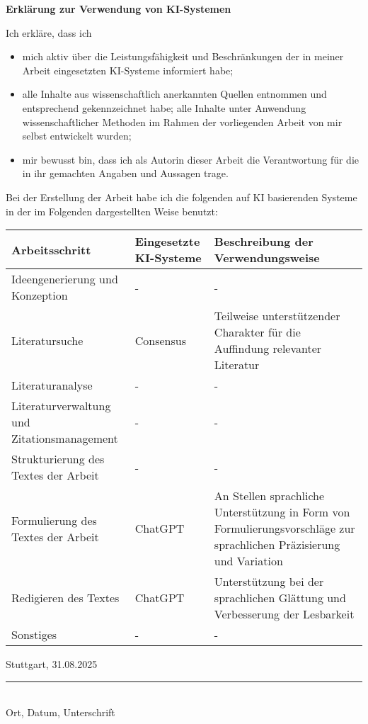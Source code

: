 \clearpage
\thispagestyle{plain} %

{\large\textbf{Erklärung zur Verwendung von \acs{KI}-Systemen}}\par\vspace{0.8\baselineskip}

Ich erkläre, dass ich
\begin{itemize}[leftmargin=2.2em,label=\checkedbox,itemsep=0.45\baselineskip]
  \item mich aktiv über die Leistungsfähigkeit und Beschränkungen der in meiner Arbeit eingesetzten \ac{KI}-Systeme informiert habe;
  \item alle Inhalte aus wissenschaftlich anerkannten Quellen entnommen und entsprechend gekennzeichnet habe; alle Inhalte unter Anwendung wissenschaftlicher Methoden im Rahmen der vorliegenden Arbeit von mir selbst entwickelt wurden;
  \item mir bewusst bin, dass ich als Autorin dieser Arbeit die Verantwortung für die in ihr gemachten Angaben und Aussagen trage.
\end{itemize}

\vspace{0.6\baselineskip}
Bei der Erstellung der Arbeit habe ich die folgenden auf \ac{KI} basierenden Systeme in der im Folgenden dargestellten Weise benutzt:\par\vspace{0.6\baselineskip}

\noindent
\begin{tabularx}{\textwidth}{|p{}|p{}|Y|}
\hline
\textbf{Arbeitsschritt} & \textbf{Eingesetzte \ac{KI}-Systeme} & \textbf{Beschreibung der Verwendungsweise} \\
\hline
Ideengenerierung und Konzeption & - & - \\
\hline
Literatursuche & Consensus & Teilweise unterstützender Charakter für die Auffindung relevanter Literatur \\
\hline
Literaturanalyse & - & - \\
\hline
Literaturverwaltung und Zitationsmanagement & - & - \\
\hline
Strukturierung des Textes der Arbeit & - & - \\
\hline
Formulierung des Textes der Arbeit & ChatGPT & An Stellen sprachliche Unterstützung in Form von Formulierungsvorschläge zur sprachlichen Präzisierung und Variation \\
\hline
Redigieren des Textes & ChatGPT & Unterstützung bei der sprachlichen Glättung und Verbesserung der Lesbarkeit \\
\hline
Sonstiges & - & - \\
\hline
\end{tabularx}

\vspace{1.6cm}
\noindent Stuttgart, 31.08.2025

\vspace{1.4cm}
\noindent\rule{7cm}{0.4pt}\\
\small Ort, Datum, Unterschrift
\clearpage